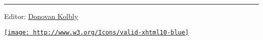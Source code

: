 \begin{center}\rule{0.5\linewidth}{\linethickness}\end{center}

Editor:
\href{mailto:srfi\%20minus\%20editors\%20at\%20srfi\%20dot\%20schemers\%20dot\%20org}{Donovan
Kolbly}

\href{http://validator.w3.org/check/referer}{\texttt{[image: http://www.w3.org/Icons/valid-xhtml10-blue]}}
